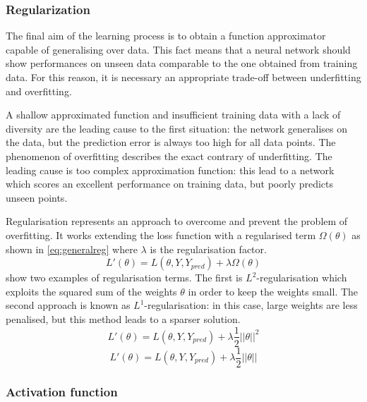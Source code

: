 \subsubsection{Regularization}

The final aim of the learning process is to obtain a function approximator capable of generalising over data. This fact means that a neural network should show performances on unseen data comparable to the one obtained from training data. For this reason, it is necessary an appropriate trade-off between underfitting and overfitting.

A shallow approximated function and insufficient training data with a lack of diversity are the leading cause to the first situation: the network generalises on the data, but the prediction error is always too high for all data points.
The phenomenon of overfitting describes the exact contrary of underfitting. The leading cause is too complex approximation function: this lead to a network which scores an excellent performance on training data, but poorly predicts unseen points.

Regularisation \cite{bishop2006pattern,lecun2015deep} represents an approach to overcome and prevent the problem of overfitting. It works extending the loss function with a regularised term $\Omega(\theta)$ as shown in \vref{eq:generalreg} where $\lambda$ is the regularisation factor.
\begin{equation}\label{eq:generalreg}
	L'(\theta) = L(\theta, Y, Y_{pred}) + \lambda \Omega(\theta)
\end{equation}
 show two examples of regularisation terms. The first is $L^2$-regularisation which exploits the squared sum of the weights $\theta$ in order to keep the weights small. The second approach is known as $L^1$-regularisation: in this case, large weights are less penalised, but this method leads to a sparser solution.
\begin{equation}\label{eq:l2reg}
	L'(\theta) = L(\theta, Y, Y_{pred}) + \lambda \frac{1}{2}||\theta||^2
\end{equation}
\begin{equation}\label{eq:l1reg}
	L'(\theta) = L(\theta, Y, Y_{pred}) + \lambda \frac{1}{2}||\theta||
\end{equation}


\subsubsection{Activation function}

